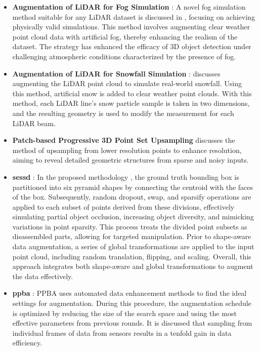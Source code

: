 \begin{itemize}
    \item \textbf{Augmentation of LiDAR for Fog Simulation} : A novel fog simulation method suitable for any LiDAR dataset is discussed in \parencite{fog_sim_2021}, focusing on achieving physically valid simulations. This method involves augmenting clear weather point cloud data with artificial fog, thereby enhancing the realism of the dataset. The strategy has enhanced the efficacy of 3D object detection under challenging atmospheric conditions characterized by the presence of fog.
    \item \textbf{Augmentation of LiDAR for Snowfall Simulation} :\parencite{snow_sim_2022} discusses augmenting the LiDAR point cloud to simulate real-world snowfall. Using this method, artificial snow is added to clear weather point clouds. With this method, each LiDAR line's snow particle sample is taken in two dimensions, and the resulting geometry is used to modify the measurement for each LiDAR beam.
    \item \textbf{Patch-based Progressive 3D Point Set Upsampling} \parencite{patched_up_2018} discusses the method of upsampling from lower resolution points to enhance resolution, aiming to reveal detailed geometric structures from sparse and noisy inputs.
    \item \textbf{\acrfull{sessd}} : In the proposed methodology \parencite{sessd_2021}, the ground truth bounding box is partitioned into six pyramid shapes by connecting the centroid with the faces of the box. Subsequently, random dropout, swap, and sparsify operations are applied to each subset of points derived from these divisions, effectively simulating partial object occlusion, increasing object diversity, and mimicking variations in point sparsity. This process treats the divided point subsets as disassembled parts, allowing for targeted manipulation. Prior to shape-aware data augmentation, a series of global transformations are applied to the input point cloud, including random translation, flipping, and scaling. Overall, this approach integrates both shape-aware and global transformations to augment the data effectively.
    \item \textbf{\acrfull{ppba}} : PPBA \parencite{ppba_2020} uses automated data enhancement methods to find the ideal settings for augmentation. During this procedure, the augmentation schedule is optimized by reducing the size of the search space and using the most effective parameters from previous rounds. It is discussed that sampling from individual frames of data from sensors results in a tenfold gain in data efficiency.

\end{itemize}
